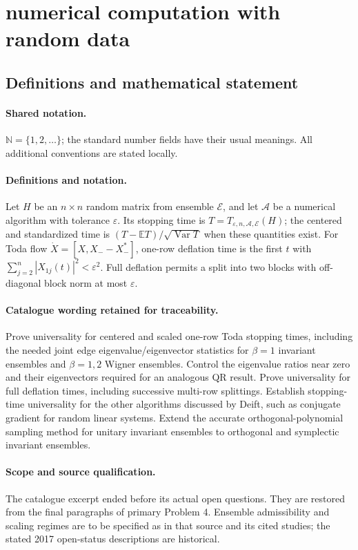 \documentclass[11pt]{article}
\begin{document}
\section{numerical computation with random data}\label{statement}

\subsection{Definitions and mathematical statement}

\paragraph{Shared notation.}$\mathbb N=\{1,2,\ldots\}$; the standard number fields have their usual meanings. All additional conventions are stated locally.


\paragraph{Definitions and notation.}Let $H$ be an $n\times n$ random matrix from ensemble $\mathcal E$, and let $\mathcal A$ be a numerical algorithm with tolerance $\varepsilon$. Its stopping time is $T=T_{\varepsilon,n,\mathcal A,\mathcal E}(H)$; the centered and standardized time is $(T-\mathbb ET)/\sqrt{\operatorname{Var}T}$ when these quantities exist. For Toda flow $\dot X=[X,X_--X_-^*]$, one-row deflation time is the first $t$ with $\sum_{j=2}^n|X_{1j}(t)|^2<\varepsilon^2$. Full deflation permits a split into two blocks with off-diagonal block norm at most $\varepsilon$.

\paragraph{Catalogue wording retained for traceability.}
Prove universality for centered and scaled one-row Toda stopping times, including the needed joint edge eigenvalue/eigenvector statistics for $\beta=1$ invariant ensembles and $\beta=1,2$ Wigner ensembles. Control the eigenvalue ratios near zero and their eigenvectors required for an analogous QR result. Prove universality for full deflation times, including successive multi-row splittings. Establish stopping-time universality for the other algorithms discussed by Deift, such as conjugate gradient for random linear systems. Extend the accurate orthogonal-polynomial sampling method for unitary invariant ensembles to orthogonal and symplectic invariant ensembles.
\paragraph{Scope and source qualification.}The catalogue excerpt ended before its actual open questions. They are restored from the final paragraphs of primary Problem 4. Ensemble admissibility and scaling regimes are to be specified as in that source and its cited studies; the stated 2017 open-status descriptions are historical.
\end{document}
